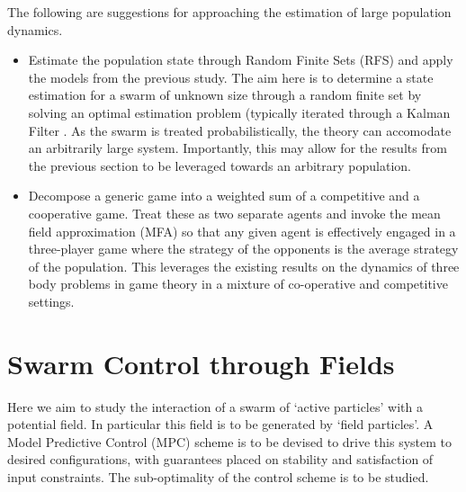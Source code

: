 \documentclass[.../main.tex]{subfiles}
\begin{document}
	The following are suggestions for approaching the estimation of large population dynamics.

	\begin{itemize}
		\item Estimate the population state through Random Finite Sets (RFS) and
	apply the models from the previous study. The aim here is to determine a state
	estimation for a swarm of unknown size through a random finite set by solving
	an optimal estimation problem  (typically iterated through a Kalman Filter
	\cite{Doerr2019}. As the swarm is treated probabilistically, the theory can
	accomodate an arbitrarily large system. Importantly, this may allow for the
	results from the previous section to be leveraged towards an arbitrary
	population. 

	\item Decompose a generic game into a weighted sum of a
	competitive and a cooperative game. Treat these as two separate agents and
	invoke the mean field approximation (MFA) so that any given agent is
	effectively engaged in a three-player game where the strategy of the opponents
	is the average strategy of the population. This leverages the existing results
	on the dynamics of three body problems in game theory \cite{Nagarajan2018} in
	a mixture of co-operative and competitive settings.
	\end{itemize}

	


    \section{Swarm Control through Fields} \label{sec::Swarm_Field_Control}

    Here we aim to study the interaction of a swarm of `active particles' with a potential field.
    In
    particular this field is to be generated by `field particles'. A Model Predictive Control 
    (MPC) scheme
    is to be devised to drive this system to desired configurations, with guarantees placed on
    stability and satisfaction of input constraints. The sub-optimality of the control
    scheme is to be studied.
\end{document}
